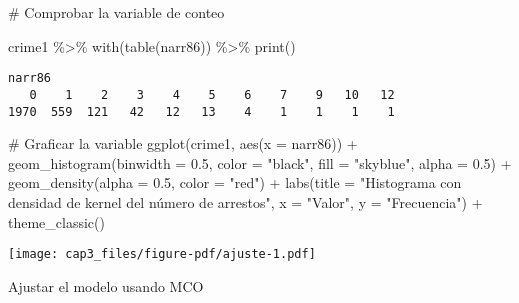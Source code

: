 \documentclass[
  letterpaper,
  DIV=11,
  numbers=noendperiod]{scrreprt}
\newenvironment{Shaded}{\begin{snugshade}}{\end{snugshade}}
\newcommand{\AttributeTok}[1]{\textcolor[rgb]{0.40,0.45,0.13}{#1}}
\newcommand{\CommentTok}[1]{\textcolor[rgb]{0.37,0.37,0.37}{#1}}
\newcommand{\FloatTok}[1]{\textcolor[rgb]{0.68,0.00,0.00}{#1}}
\newcommand{\FunctionTok}[1]{\textcolor[rgb]{0.28,0.35,0.67}{#1}}
\newcommand{\NormalTok}[1]{\textcolor[rgb]{0.00,0.23,0.31}{#1}}
\newcommand{\SpecialCharTok}[1]{\textcolor[rgb]{0.37,0.37,0.37}{#1}}
\newcommand{\StringTok}[1]{\textcolor[rgb]{0.13,0.47,0.30}{#1}}
\begin{document}
\begin{Shaded}
\begin{Highlighting}[]
\CommentTok{\# Comprobar la variable de conteo}

\NormalTok{crime1 }\SpecialCharTok{\%\textgreater{}\%} 
  \FunctionTok{with}\NormalTok{(}\FunctionTok{table}\NormalTok{(narr86)) }\SpecialCharTok{\%\textgreater{}\%} 
  \FunctionTok{print}\NormalTok{()}
\end{Highlighting}
\end{Shaded}

\begin{verbatim}
narr86
   0    1    2    3    4    5    6    7    9   10   12 
1970  559  121   42   12   13    4    1    1    1    1 
\end{verbatim}

\begin{Shaded}
\begin{Highlighting}[]
\CommentTok{\# Graficar la variable}
\FunctionTok{ggplot}\NormalTok{(crime1, }\FunctionTok{aes}\NormalTok{(}\AttributeTok{x =}\NormalTok{ narr86)) }\SpecialCharTok{+} 
  \FunctionTok{geom\_histogram}\NormalTok{(}\AttributeTok{binwidth =} \FloatTok{0.5}\NormalTok{, }
                 \AttributeTok{color =} \StringTok{"black"}\NormalTok{, }
                 \AttributeTok{fill =} \StringTok{"skyblue"}\NormalTok{,}
                 \AttributeTok{alpha =} \FloatTok{0.5}\NormalTok{) }\SpecialCharTok{+} 
  \FunctionTok{geom\_density}\NormalTok{(}\AttributeTok{alpha =} \FloatTok{0.5}\NormalTok{, }
               \AttributeTok{color =} \StringTok{"red"}\NormalTok{) }\SpecialCharTok{+} 
  \FunctionTok{labs}\NormalTok{(}\AttributeTok{title =} \StringTok{"Histograma con densidad de kernel del número de arrestos"}\NormalTok{, }
       \AttributeTok{x =} \StringTok{"Valor"}\NormalTok{, }\AttributeTok{y =} \StringTok{"Frecuencia"}\NormalTok{) }\SpecialCharTok{+} 
  \FunctionTok{theme\_classic}\NormalTok{()}
\end{Highlighting}
\end{Shaded}

\texttt{[image: cap3\_files/figure-pdf/ajuste-1.pdf]}

Ajustar el modelo usando MCO
\end{document}
